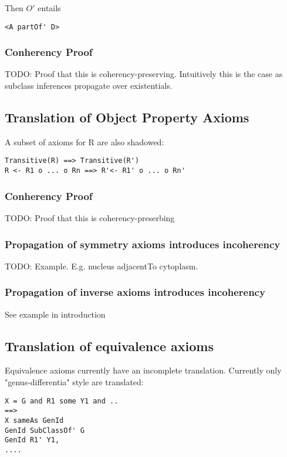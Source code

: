 \documentclass{my}
\begin{document}
Then $O'$ entails 

\begin{verbatim}
<A partOf' D>
\end{verbatim}

\subsubsection{Conherency Proof} TODO: Proof that this is
coherency-preserving. Intuitively this is the case as subclass
inferences propagate over existentials.

\subsection{Translation of Object Property Axioms}

A subset of axioms for R are also shadowed:

\begin{verbatim}
Transitive(R) ==> Transitive(R')
R <- R1 o ... o Rn ==> R'<- R1' o ... o Rn'
\end{verbatim}

\subsubsection{Conherency Proof} TODO: Proof that this is coherency-preserbing

\subsubsection{Propagation of symmetry axioms introduces incoherency}
TODO: Example. E.g. nucleus adjacentTo cytoplasm.

\subsubsection{Propagation of inverse axioms introduces incoherency}
See example in introduction

\subsection{Translation of equivalence axioms}

Equivalence axioms currently have an incomplete translation. Currently only "genus-differentia" style
are translated:



\begin{verbatim}
X = G and R1 some Y1 and ..
==>
X sameAs GenId
GenId SubClassOf' G
GenId R1' Y1,
....
\end{verbatim}
\end{document}
